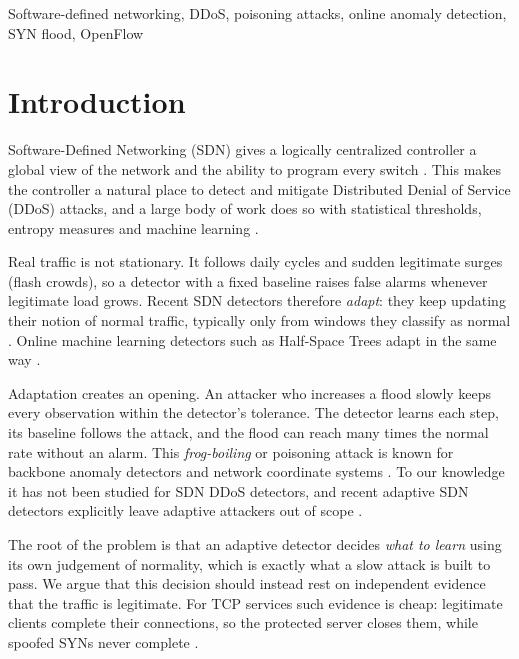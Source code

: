 \documentclass[conference]{IEEEtran}
\begin{document}
\begin{IEEEkeywords}
Software-defined networking, DDoS, poisoning attacks, online anomaly detection, SYN flood, OpenFlow
\end{IEEEkeywords}

\section{Introduction}
Software-Defined Networking (SDN) gives a logically centralized controller a global view of the network and the ability to program every switch \cite{mckeown2008openflow,kreutz2015sdn}. This makes the controller a natural place to detect and mitigate Distributed Denial of Service (DDoS) attacks, and a large body of work does so with statistical thresholds, entropy measures and machine learning \cite{yan2016sdnddos,braga2010som,mousavi2015entropy}.

Real traffic is not stationary. It follows daily cycles and sudden legitimate surges (flash crowds), so a detector with a fixed baseline raises false alarms whenever legitimate load grows. Recent SDN detectors therefore \emph{adapt}: they keep updating their notion of normal traffic, typically only from windows they classify as normal \cite{zhang2026time}. Online machine learning detectors such as Half-Space Trees adapt in the same way \cite{tan2011hst}.

Adaptation creates an opening. An attacker who increases a flood slowly keeps every observation within the detector's tolerance. The detector learns each step, its baseline follows the attack, and the flood can reach many times the normal rate without an alarm. This \emph{frog-boiling} or poisoning attack is known for backbone anomaly detectors \cite{rubinstein2009antidote} and network coordinate systems \cite{chantin2009frog}. To our knowledge it has not been studied for SDN DDoS detectors, and recent adaptive SDN detectors explicitly leave adaptive attackers out of scope \cite{zhang2026time}.

The root of the problem is that an adaptive detector decides \emph{what to learn} using its own judgement of normality, which is exactly what a slow attack is built to pass. We argue that this decision should instead rest on independent evidence that the traffic is legitimate. For TCP services such evidence is cheap: legitimate clients complete their connections, so the protected server closes them, while spoofed SYNs never complete \cite{wang2002syn}.
\end{document}
